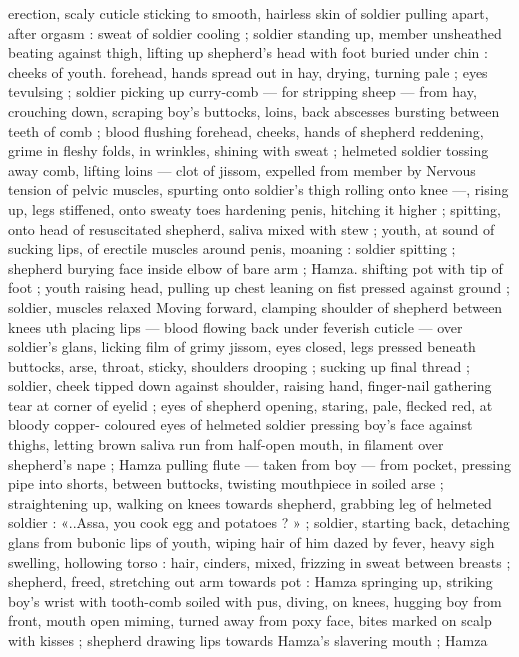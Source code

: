 erection, scaly cuticle sticking to smooth, hairless skin of soldier
pulling apart, after orgasm : sweat of soldier cooling ; soldier
standing up, member unsheathed beating against thigh, lifting up
shepherd's head with foot buried under chin : cheeks of youth.
forehead, hands spread out in hay, drying, turning pale ; eyes
tevulsing ; soldier picking up curry-comb --- for stripping sheep ---
from hay, crouching down, scraping boy's buttocks, loins, back
abscesses bursting between teeth of comb ; blood flushing
forehead, cheeks, hands of shepherd reddening, grime in fleshy
folds, in wrinkles, shining with sweat ; helmeted soldier tossing away
comb, lifting loins --- clot of jissom, expelled from member by
Nervous tension of pelvic muscles, spurting onto soldier's thigh
rolling onto knee ---, rising up, legs stiffened, onto sweaty toes
hardening penis, hitching it higher ; spitting, onto head of
resuscitated shepherd, saliva mixed with stew ; youth, at sound of
sucking lips, of erectile muscles around penis, moaning : soldier
spitting ; shepherd burying face inside elbow of bare arm ; Hamza.
shifting pot with tip of foot ; youth raising head, pulling up chest
leaning on fist pressed against ground ; soldier, muscles relaxed
Moving forward, clamping shoulder of shepherd between knees
uth placing lips --- blood flowing back under feverish cuticle ---
over soldier's glans, licking film of grimy jissom, eyes closed, legs
pressed beneath buttocks, arse, throat, sticky, shoulders drooping ;
sucking up final thread ; soldier, cheek tipped down against shoulder,
raising hand, finger-nail gathering tear at corner of eyelid ; eyes of
shepherd opening, staring, pale, flecked red, at bloody copper-
coloured eyes of helmeted soldier pressing boy's face against
thighs, letting brown saliva run from half-open mouth, in filament
over shepherd's nape ; Hamza pulling flute --- taken from boy ---
from pocket, pressing pipe into shorts, between buttocks, twisting
mouthpiece in soiled arse ; straightening up, walking on knees
towards shepherd, grabbing leg of helmeted soldier : «..Assa, you
cook egg and potatoes ? » ; soldier, starting back, detaching glans
from bubonic lips of youth, wiping hair of him dazed by fever, heavy
sigh swelling, hollowing torso : hair, cinders, mixed, frizzing in sweat
between breasts ; shepherd, freed, stretching out arm towards pot :
Hamza springing up, striking boy's wrist with tooth-comb soiled with
pus, diving, on knees, hugging boy from front, mouth open miming,
turned away from poxy face, bites marked on scalp with kisses ;
shepherd drawing lips towards Hamza’s slavering mouth ; Hamza
